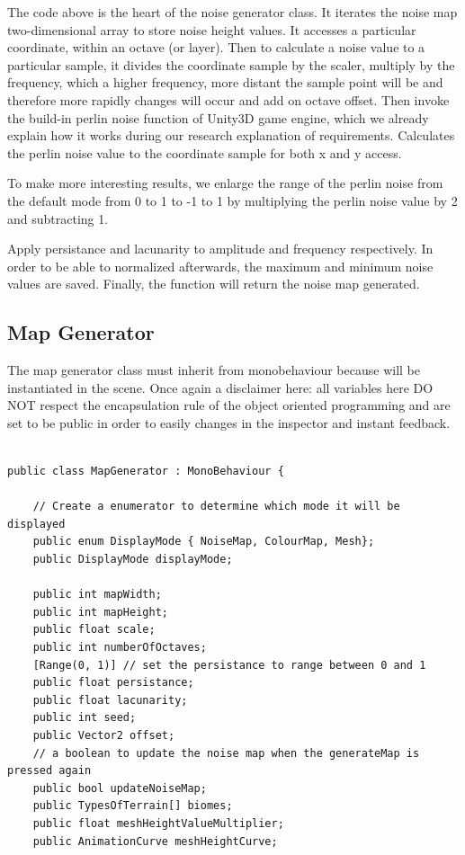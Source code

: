 \documentclass[a4paper,12pt]{book}
\begin{document}
The code above is the heart of the noise generator class. It iterates the noise map two-dimensional array to store noise height values. It accesses a particular coordinate, within an octave (or layer). Then to calculate a noise value to a particular sample, it divides the coordinate sample by the scaler, multiply by the frequency, which a higher frequency, more distant the sample point will be and therefore more rapidly changes will occur and add on octave offset.
Then invoke the build-in perlin noise function of Unity3D game engine, which we already explain how it works during our research explanation of requirements. Calculates the perlin noise value to the coordinate sample for both x and y access. 

To make more interesting results, we enlarge the range of the perlin noise from the default mode from 0 to 1 to -1 to 1 by multiplying the perlin noise value by 2 and subtracting 1.

Apply persistance and lacunarity to amplitude and frequency respectively. 
In order to be able to normalized afterwards, the maximum and minimum noise values are saved.
Finally, the function will return the noise map generated.


\subsection{Map Generator}

The map generator class must inherit from monobehaviour because will be instantiated in the scene. Once again a disclaimer here: all variables here DO NOT respect the encapsulation rule of the object oriented programming and are set to be public in order to easily changes in the inspector and instant feedback.

\begin{lstlisting}

public class MapGenerator : MonoBehaviour {

    // Create a enumerator to determine which mode it will be displayed
    public enum DisplayMode { NoiseMap, ColourMap, Mesh};
    public DisplayMode displayMode;

    public int mapWidth;
    public int mapHeight;
    public float scale;
    public int numberOfOctaves;
    [Range(0, 1)] // set the persistance to range between 0 and 1
    public float persistance;
    public float lacunarity;
    public int seed;
    public Vector2 offset;
    // a boolean to update the noise map when the generateMap is pressed again
    public bool updateNoiseMap;
    public TypesOfTerrain[] biomes;
    public float meshHeightValueMultiplier;
    public AnimationCurve meshHeightCurve; 
    

\end{lstlisting}
\end{document}
